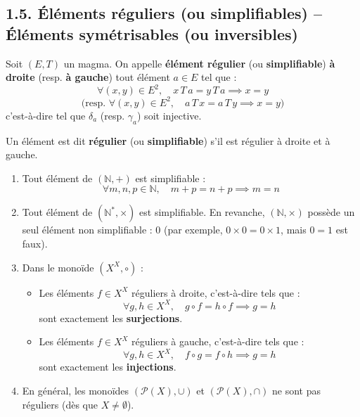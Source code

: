\documentclass[a4paper,11pt]{article}
\newcommand{\N}{\mathbb{N}}
\newcommand{\mot}[1]{\textcolor{bordeaux}{\textbf{#1}}}
\begin{document}
\newpage
\subsection{1.5. Éléments réguliers (ou simplifiables) -- Éléments symétrisables (ou inversibles)}

\begin{definition}
Soit $(E, T)$ un magma. On appelle \mot{élément régulier} (ou \mot{simplifiable}) \mot{à droite} (resp. \mot{à gauche}) tout élément $a \in E$ tel que :
\[
\forall (x, y) \in E^2, \quad x \, T \, a = y \, T \, a \implies x = y
\]
\[
\text{(resp. } \forall (x, y) \in E^2, \quad a \, T \, x = a \, T \, y \implies x = y \text{)}
\]
c'est-à-dire tel que $\delta_a$ (resp. $\gamma_a$) soit injective.

Un élément est dit \mot{régulier} (ou \mot{simplifiable}) s'il est régulier à droite et à gauche.
\end{definition}

\begin{exemples}
\begin{enumerate}
    \item Tout élément de $(\N, +)$ est simplifiable :
    \[
    \forall m, n, p \in \N, \quad m + p = n + p \implies m = n
    \]
    \item Tout élément de $(\N^*, \times)$ est simplifiable. En revanche, $(\N, \times)$ possède un seul élément non simplifiable : $0$ (par exemple, $0 \times 0 = 0 \times 1$, mais $0 = 1$ est faux).
    \item Dans le monoïde $(X^X, \circ)$ :
    \begin{itemize}
        \item Les éléments $f \in X^X$ réguliers à droite, c'est-à-dire tels que :
        \[
        \forall g, h \in X^X, \quad g \circ f = h \circ f \implies g = h
        \]
        sont exactement les \mot{surjections}.
        \item Les éléments $f \in X^X$ réguliers à gauche, c'est-à-dire tels que :
        \[
        \forall g, h \in X^X, \quad f \circ g = f \circ h \implies g = h
        \]
        sont exactement les \mot{injections}.
    \end{itemize}
    \item En général, les monoïdes $(\mathcal{P}(X), \cup)$ et $(\mathcal{P}(X), \cap)$ ne sont pas réguliers (dès que $X \neq \emptyset$).
\end{enumerate}
\end{exemples}
\end{document}
